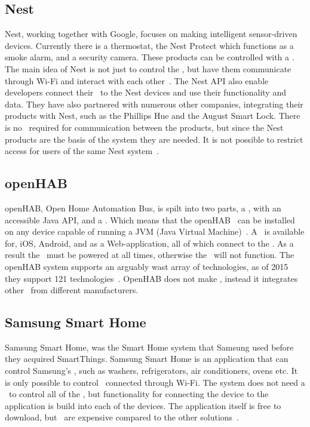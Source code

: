 \subsection{Nest} \label{sec:nest}
Nest, working together with Google, focuses on making intelligent sensor-driven devices. Currently there is a thermostat, the Nest Protect which functions as a smoke alarm, and a security camera. These products can be controlled with a \phone. The main idea of Nest is not just to control the \sdevs, but have them communicate through Wi-Fi and interact with each other~\citep{nest}. The Nest API also enable developers connect their \sdevs~to the Nest devices and use their functionality and data. They have also partnered with numerous other companies, integrating their products with Nest, such as the Phillips Hue and the August Smart Lock. There is no \hub~required for communication between the products, but since the Nest products are the basis of the system they are needed. It is not possible to restrict access for users of the same Nest system~\citep{nest-dev}. 

\subsection{openHAB} \label{sec:openhab}
openHAB, Open Home Automation Bus, is spilt into two parts, a \hub, with an accessible Java API, and a \phone. Which means that the openHAB \hub~can be installed on any device capable of running a JVM (Java Virtual Machine)~\citep{openhab-architecture}. A \phone~is available for, iOS, Android, and as a Web-application, all of which connect to the \hub. As a result the \hub~must be powered at all times, otherwise the \phone~will not function. The openHAB system supports an arguably wast array of technologies, as of 2015 they support 121 technologies~\citep{openhab-technologies}. OpenHAB does not make \sdevs, instead it integrates other \sdevs~from different manufacturers. 

\subsection{Samsung Smart Home} \label{sec:samsung-smart-home}
Samsung Smart Home, was the Smart Home system that Samsung used before they acquired SmartThings. Samsung Smart Home is an application that can control Samsung's \sdevs, such as washers, refrigerators, air conditioners, ovens etc. It is only possible to control \sdevs~connected through Wi-Fi. The system does not need a \hub~to control all of the \sdevs, but functionality for connecting the device to the application is build into each of the devices. The application itself is free to download, but \sdevs~are expensive compared to the other solutions~\citep{samsung-smart-home}. 

